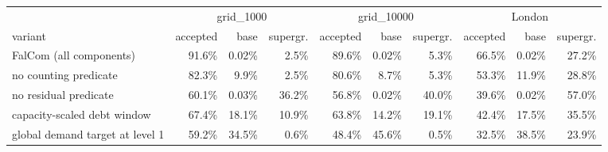 \begin{tabular}{lrrrrrrrrr}
\toprule
 & \multicolumn{3}{c}{grid\_1000} & \multicolumn{3}{c}{grid\_10000} & \multicolumn{3}{c}{London} \\
\cmidrule(lr){2-4}\cmidrule(lr){5-7}\cmidrule(lr){8-10}
variant & accepted & base & supergr. & accepted & base & supergr. & accepted & base & supergr. \\
\midrule
FalCom (all components) & 91.6\% & 0.02\% & 2.5\% & 89.6\% & 0.02\% & 5.3\% & 66.5\% & 0.02\% & 27.2\% \\
\midrule
no counting predicate & 82.3\% & 9.9\% & 2.5\% & 80.6\% & 8.7\% & 5.3\% & 53.3\% & 11.9\% & 28.8\% \\
no residual predicate & 60.1\% & 0.03\% & 36.2\% & 56.8\% & 0.02\% & 40.0\% & 39.6\% & 0.02\% & 57.0\% \\
capacity-scaled debt window & 67.4\% & 18.1\% & 10.9\% & 63.8\% & 14.2\% & 19.1\% & 42.4\% & 17.5\% & 35.5\% \\
global demand target at level 1 & 59.2\% & 34.5\% & 0.6\% & 48.4\% & 45.6\% & 0.5\% & 32.5\% & 38.5\% & 23.9\% \\
\bottomrule
\end{tabular}
